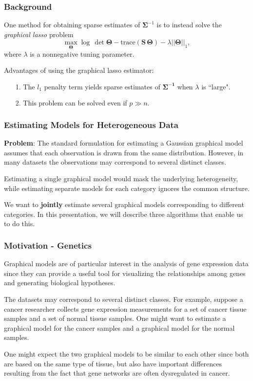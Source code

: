 \documentclass[t]{beamer}
\begin{document}
\begin{frame}
\frametitle{Background}
One method for obtaining sparse estimates of $\bm{\Sigma}^{-1}$ is to instead solve the \textit{graphical lasso} problem
\small
\begin{equation*}
\max_{\bm{\Theta}} \log\,\det \bm{\Theta} - \mbox{trace}\left(\bm{S \,\Theta}\right) - \lambda ||\bm{\Theta}||_{1},
\end{equation*}
\normalsize
where $\lambda$ is a nonnegative tuning parameter. 



\bigskip
\pause
Advantages of using the graphical lasso estimator:
\begin{itemize}
\item[1.]  The $l_{1}$ penalty term yields sparse estimates of $\bm{\Sigma^{-1}}$ when $\lambda$ is ``large".

\bigskip
\item[2.] This problem can be solved even if $p \gg n$.
\end{itemize}
\end{frame}


\begin{frame}
\frametitle{Estimating Models for Heterogeneous Data}
\textbf{Problem}: The standard formulation for estimating a Gaussian graphical model assumes that each observation is drawn from the same distribution. However, in many datasets the observations may correspond to several distinct classes. 

\bigskip
\pause
Estimating a single graphical model would mask the underlying heterogeneity, while estimating separate models for each category ignores the common structure.

\bigskip
\pause
We want to \textbf{jointly} estimate several graphical models corresponding to different categories. In this presentation, we will describe three algorithms that enable us to do this.

\end{frame}


\begin{frame}
\frametitle{Motivation - Genetics}
Graphical models are of particular interest in the analysis of gene expression data since they can provide a useful tool for visualizing the relationships among genes and generating biological hypotheses. 

\bigskip
\pause
The datasets may correspond to several distinct classes. For example, suppose a cancer researcher collects gene expression measurements for a set of cancer tissue samples and a set of normal tissue samples.  One might want to estimate a graphical model for the cancer samples and a graphical model for the normal samples.

\bigskip
\pause
One might expect the two graphical models to be similar to each other since both are based on the same type of tissue, but also have important differences resulting from the fact that gene networks are often dysregulated in cancer. 

\end{frame}
\end{document}
